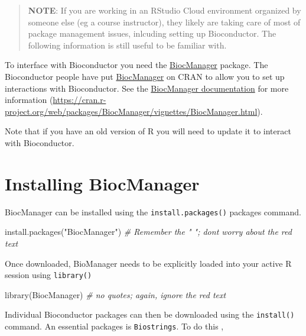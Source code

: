 \documentclass[
]{book}
\newenvironment{Shaded}{\begin{snugshade}}{\end{snugshade}}
\newcommand{\CommentTok}[1]{\textcolor[rgb]{0.56,0.35,0.01}{\textit{#1}}}
\newcommand{\FunctionTok}[1]{\textcolor[rgb]{0.00,0.00,0.00}{#1}}
\newcommand{\NormalTok}[1]{#1}
\newcommand{\StringTok}[1]{\textcolor[rgb]{0.31,0.60,0.02}{#1}}
\begin{document}
\begin{quote}
\textbf{NOTE}: If you are working in an RStudio Cloud environment organized by someone else (eg a course instructor), they likely are taking care of most of package management issues, inlcuding setting up Bioconductor. The following information is still useful to be familiar with.
\end{quote}

To interface with Bioconductor you need the \href{https://cran.r-project.org/web/packages/BiocManager/vignettes/BiocManager.html}{BiocManager} package. The Bioconductor people have put \href{https://cran.r-project.org/web/packages/BiocManager/vignettes/BiocManager.html}{BiocManager} on CRAN to allow you to set up interactions with Bioconductor. See the \href{https://cran.r-project.org/web/packages/BiocManager/vignettes/BiocManager.html}{BiocManager documentation} for more information (\url{https://cran.r-project.org/web/packages/BiocManager/vignettes/BiocManager.html}).

Note that if you have an old version of R you will need to update it to interact with Bioconductor.

\hypertarget{installing-biocmanager}{%
\section{Installing BiocManager}\label{installing-biocmanager}}

BiocManager can be installed using the \texttt{install.packages()} packages command.

\begin{Shaded}
\begin{Highlighting}[]
\FunctionTok{install.packages}\NormalTok{(}\StringTok{"BiocManager"}\NormalTok{) }\CommentTok{\# Remember the "  "; don\textquotesingle{}t worry about the red text}
\end{Highlighting}
\end{Shaded}

Once downloaded, BioManager needs to be explicitly loaded into your active R session using \texttt{library()}

\begin{Shaded}
\begin{Highlighting}[]
\FunctionTok{library}\NormalTok{(BiocManager) }\CommentTok{\# no quotes; again, ignore the red text}
\end{Highlighting}
\end{Shaded}

Individual Bioconductor packages can then be downloaded using the \texttt{install()} command. An essential packages is \texttt{Biostrings}. To do this ,
\end{document}
